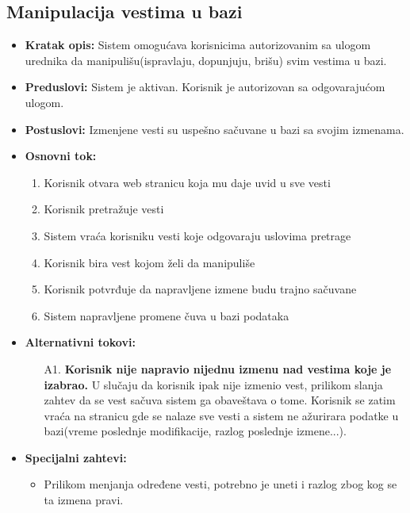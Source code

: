 \documentclass{article}
\begin{document}
\newpage

\subsection{Manipulacija vestima u bazi}
\begin{itemize}
    \item \textbf{Kratak opis:} Sistem omogućava korisnicima autorizovanim sa ulogom urednika da manipulišu(ispravlaju, dopunjuju, brišu) svim vestima u bazi.
    \item \textbf{Preduslovi:} Sistem je aktivan. Korisnik je autorizovan sa odgovarajućom ulogom. 
    \item \textbf{Postuslovi:} Izmenjene vesti su uspešno sačuvane u bazi sa svojim izmenama.
    \item \textbf{Osnovni tok:}
        \begin{enumerate}
            \item Korisnik otvara web stranicu koja mu daje uvid u sve vesti
	        \item Korisnik pretražuje vesti
	        \item Sistem vraća korisniku vesti koje odgovaraju uslovima pretrage
	        \item Korisnik bira vest kojom želi da manipuliše
	        \item Korisnik potvrđuje da napravljene izmene budu trajno sačuvane
	        \item Sistem napravljene promene čuva u bazi podataka
	    \end{enumerate}
    \item \textbf{Alternativni tokovi:}
        \begin{itemize}
            \item[A1.] \textbf{Korisnik nije napravio nijednu izmenu nad vestima koje je izabrao.} U slučaju da korisnik ipak nije izmenio vest, prilikom slanja zahtev da se vest sačuva sistem ga obaveštava o tome. Korisnik se zatim vraća na stranicu gde se nalaze sve vesti a sistem ne ažurirara podatke u bazi(vreme poslednje modifikacije, razlog poslednje izmene...).
        \end{itemize}
    \item \textbf{Specijalni zahtevi:}
        \begin{itemize}
			\item Prilikom menjanja određene vesti, potrebno je uneti i razlog zbog kog se ta izmena pravi.
		\end{itemize}
\end{itemize}
\end{document}
